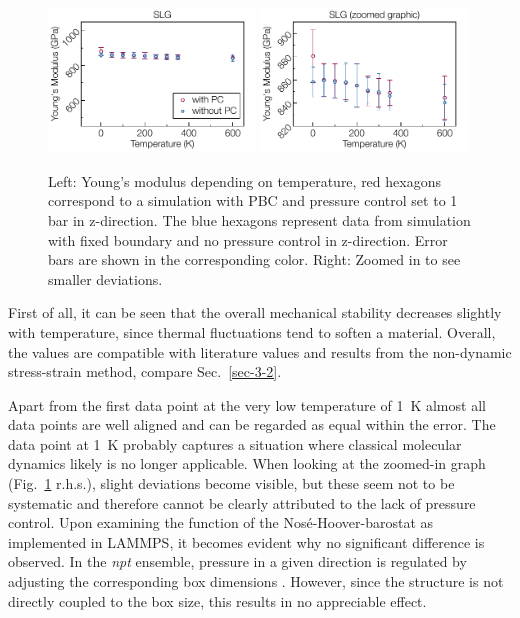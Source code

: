 \documentclass[preprint,12pt]{elsarticle}
\newcommand{\figref}[1]{Fig.~\protect\ref{#1}}
\begin{document}
\begin{figure}[ht!]
\centering
\includegraphics[width=0.49\textwidth]{YM4CNM-f-7a.pdf}
\includegraphics[width=0.49\textwidth]{YM4CNM-f-7b.pdf}
\caption{Left: Young's modulus depending on temperature, red hexagons correspond to a simulation with 
PBC and pressure control set to 1 bar in z-direction. 
The blue hexagons represent data from simulation with fixed boundary 
and no pressure control in z-direction. Error bars are shown in the corresponding color.
Right: Zoomed in to see smaller deviations.\label{graphene_baro}}
\end{figure}

First of all, it can be seen that the overall mechanical stability 
decreases slightly with temperature, since thermal fluctuations tend to soften a material. 
Overall, the values are compatible with literature values and 
results from the non-dynamic stress-strain method, compare Sec.~\ref{sec-3-2}. 

Apart from the first data point at the very low temperature of 1~K
almost all data points are well aligned and can be regarded as equal within the error.
The data point at 1~K probably captures a situation where classical 
molecular dynamics likely is no longer applicable.
When looking at the zoomed-in graph (\figref{graphene_baro} r.h.s.), 
slight deviations become visible, 
but these seem not to be systematic 
and therefore cannot be clearly attributed to the lack of pressure control. 
Upon examining the function of the Nos{\'{e}}-Hoover-barostat as implemented in LAMMPS, 
it becomes evident why no significant difference is observed. In the \textit{npt} ensemble, 
pressure in a given direction is regulated by adjusting the corresponding box dimensions \cite{LAMMPS:DOC}. 
However, since the structure is not directly coupled to the box size, this results in no appreciable effect.
\end{document}
